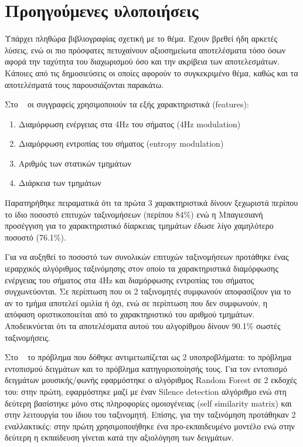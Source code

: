 \section{Προηγούμενες υλοποιήσεις}


Υπάρχει πληθώρα βιβλιογραφίας σχετική με το θέμα. Έχουν βρεθεί ήδη
αρκετές λύσεις, ενώ οι πιο πρόσφατες πετυχαίνουν αξιοσημείωτα
αποτελέσματα τόσο όσων αφορά την ταχύτητα του διαχωρισμού όσο και την ακρίβεια
των αποτελεσμάτων. Κάποιες από τις δημοσιεύσεις οι οποίες αφορούν το
συγκεκριμένο θέμα, καθώς και τα αποτελέσματά τους παρουσιάζονται παρακάτω.

\vspace{1em}
Στο ~\cite{robust} οι συγγραφείς χρησιμοποιούν τα εξής χαρακτηριστικά (features):
\begin{enumerate}[noitemsep]
\item Διαμόρφωση ενέργειας στα 4Hz του σήματος (4Hz modulation)
\item Διαμόρφωση εντροπίας του σήματος (entropy modulation)
\item Αριθμός των στατικών τμημάτων
\item Διάρκεια των τμημάτων
\end{enumerate}

Παρατηρήθηκε πειραματικά ότι τα πρώτα 3 χαρακτηριστικά δίνουν ξεχωριστά περίπου
το ίδιο ποσοστό επιτυχών ταξινομήσεων (περίπου 84\%) ενώ η Μπαγιεσιανή προσέγγιση
για το χαρακτηριστικό δίαρκειας τμημάτων έδωσε λίγο χαμηλότερο ποσοστό (76.1\%). 

Για να αυξηθεί το ποσοστό των συνολικών επιτυχών ταξινομήσεων προτάθηκε ένας
ιεραρχικός αλγόριθμος ταξινόμησης στον οποίο τα χαρακτηριστικά διαμόρφωσης
ενέργειας του σήματος στα 4Ηz και διαμόρφωσης εντροπίας του σήματος συγχωνεύονται.
Σε περίπτωση που οι 2 ταξινομητές συμφωνούν αποφασίζουν για το αν το τμήμα
αποτελεί ομιλία ή όχι, ενώ σε περίπτωση που δεν συμφωνούν, η απόφαση
οριστικοποιείται από το χαρακτηριστικό του αριθμού τμημάτων. Αποδεικνύεται ότι
τα αποτελέσματα αυτού του αλγορίθμου δίνουν 90.1\% σωστές ταξινομήσεις.

\vspace{1em}
Στο ~\cite{mirex} το πρόβλημα που δόθηκε αντιμετωπίζεται ως 2 υποπροβλήματα:
το πρόβλημα εντοπισμού δειγμάτων και το πρόβλημα κατηγοριοποίησής τους.
Για τον εντοπισμό δειγμάτων μουσικής/φωνής εφαρμόστηκε ο αλγόριθμος Random
Forest σε 2 εκδοχές του: στην πρώτη, εφαρμόστηκε μαζί με έναν Silence detection
αλγόριθμο ενώ στη δεύτερη βασίστηκε μόνο στις πληροφορίες ομοιογένειας (self
similarity matrix) και στην λειτουργία του ίδιου του ταξινομητή. Επίσης, για την
ταξινόμηση προτάθηκαν 2 εναλλακτικές: στην πρώτη χρησιμοποιήθηκε ένα
προ-εκπαιδευμένο μοντέλο ενώ στην δεύτερη η εκπαίδευση γίνεται κατά την
αξιολόγηση των δειγμάτων.

